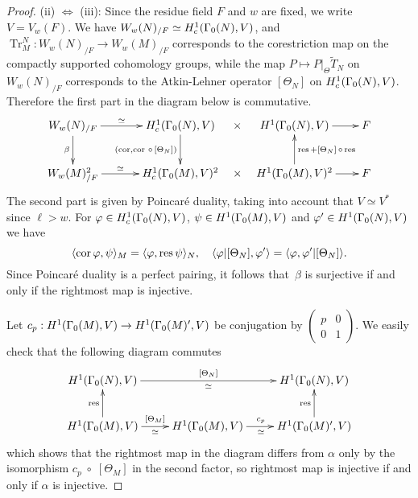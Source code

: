 \documentclass{amsart}
\theoremstyle{plain}
\theoremstyle{definition}
\numberwithin{equation}{section}
\newcommand{\Z}{{\mathbb Z}}
\newcommand{\comment}[1]{}
\def\tr{\operatorname{Tr}}\def\id{\mathrm{Id}}
\def\a{\alpha}\def\b{\beta}\def\g{\gamma}
\def\sm#1#2#3#4{\left(\begin{smallmatrix}#1&#2 \\ #3 & #4 \end{smallmatrix}\right)}
\newcommand{\wT}{\widetilde{T}}
\def\vp{\varphi}
\def\rar{\rightarrow}\def\FF{\mathbb{F}}
\def\la{\langle} \def\ra{\rangle}
\begin{document}
\begin{proof}
(ii) $\Leftrightarrow$ (iii): Since the residue field $F$ and $w$ are fixed,
we write $V=V_w(F)$. We have $W_w(N)_{/F}\simeq H_c^1(\Gamma_0(N), V)$, 
and $\tr_M^N: W_w(N)_{/F}\rar W_w(M)_{/F}$ corresponds to the corestriction
map on the compactly supported cohomology groups, while the map 
$P\mapsto P|_\Theta \wT_N$ on $W_w(N)_{/F}$ corresponds to the Atkin-Lehner 
operator $[\Theta_N]$ on $H_c^1(\Gamma_0(N), V)$. Therefore the first part in the 
diagram below is commutative. 
\[\xymatrix@C=0.7em{
W_w(N)_{/F}\ar[rrr]^-{\simeq} \ar[d]_{\beta} &&& 
H_c^1(\G_0(N), V)\ar[d]_{(\cor, \cor\,\circ\,[\Theta_N])}  
  & \times & H^1(\G_0(N), V) \ar[rr] && F \\
W_w(M)_{/F}^2\ar[rrr]^-{\simeq} &&&  
H_c^1(\G_0(M), V)^2  & \times & H^1(\G_0(M), V)^2
\ar[u]_{\res +  [\Theta_N] \,\circ\,\res} \ar[rr] && F}
\]
The second part is given by Poincar\'e duality, taking into account 
that $V\simeq V^*$ since $\ell>w$. For 
$\vp \in  H^1_c(\G_0(N), V)$, $\psi \in H^1(\Gamma_0(M), V)$ and
$\vp' \in  H^1(\G_0(N), V)$ we have~\cite[Sec. 6.3]{Hi1}
$$\la \cor \vp, \psi\ra_M=\la \vp, \res \psi \ra_N, \quad
\la \vp|[\Theta_N], \vp'\ra =\la \vp, \vp'|[\Theta_N] \ra . $$
Since Poincar\'e duality is a perfect pairing, it follows that~$\beta$ 
is surjective if and only if the rightmost map is injective. 

Let $c_p: H^1(\G_0(M), V)\rar H^1(\G_0(M)', V)$ be conjugation
by $\sm p001$. We easily check that the following diagram commutes
\[
  \xymatrix{
H^1(\G_0(N), V)\ar[rr]^{[\Theta_N]}_{\simeq} && H^1(\G_0(N), V) \\
 H^1(\G_0(M), V)\ar[u]^{\res}\ar[r]^{[\Theta_M]}_{\simeq} &
 H^1(\G_0(M), V)\ar[r]^{c_p}_{\simeq} &
 H^1(\G_0(M)', V)\ar[u]^{\res}
 }
\]
which shows that the rightmost map in the diagram differs from $\a$ only
by the isomorphism $c_p\;\circ\;[\Theta_M]$ in the second factor, so rightmost map is injective if 
and only if $\a$ is injective. 
\end{proof}
\comment{
In the second vertical map, $\Theta_p=\G_0(N)w_p \G_0(N)=\G_0(N)w_p$ is 
the double coset corresponding 
to the Atkin-Lehner involution $W_p$, where $w_p=\sm {pa}b{Nc}{pd}$ with 
$a,b,c,d\in \Z$, $pad-Mbc=1$. Its action 
on $H^1(\G_0(N), V)$ is given on cocycles by $\vp|[\Theta_p] (g)=
\vp(w_pg w_p^{-1})|_{-w} w_p$. Since 
$w_p=\g\sm p001$ with $\g\in\G_0(M)$, we have $\G_0(M)'=w_p^{-1} \G_0(M)w_p$,
so we can view the second map also as the composition 
$H^1(\G_0(M), V)\stackrel{\simeq}{\longrightarrow} 
H^1(\G_0(M)', V)\stackrel{\res}{\longrightarrow} H^1(\G_0(N), V)$,
with the isomorphism given by conjugation. Therefore the second vertical map is the
map $\a_p$. 
}
\end{document}
